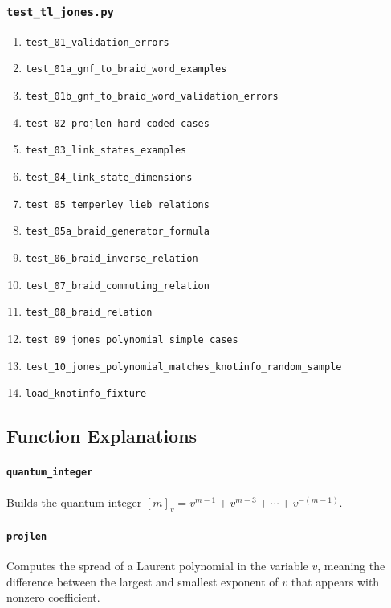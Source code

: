﻿\documentclass[10pt]{article}
\begin{document}
\subsubsection*{\texttt{test\_tl\_jones.py}}
\begin{enumerate}
  \item \texttt{test\_01\_validation\_errors}
  \item \texttt{test\_01a\_gnf\_to\_braid\_word\_examples}
  \item \texttt{test\_01b\_gnf\_to\_braid\_word\_validation\_errors}
  \item \texttt{test\_02\_projlen\_hard\_coded\_cases}
  \item \texttt{test\_03\_link\_states\_examples}
  \item \texttt{test\_04\_link\_state\_dimensions}
  \item \texttt{test\_05\_temperley\_lieb\_relations}
  \item \texttt{test\_05a\_braid\_generator\_formula}
  \item \texttt{test\_06\_braid\_inverse\_relation}
  \item \texttt{test\_07\_braid\_commuting\_relation}
  \item \texttt{test\_08\_braid\_relation}
  \item \texttt{test\_09\_jones\_polynomial\_simple\_cases}
  \item \texttt{test\_10\_jones\_polynomial\_matches\_knotinfo\_random\_sample}
  \item \texttt{load\_knotinfo\_fixture}
\end{enumerate}








\newpage
\subsection*{Function Explanations}

\paragraph{\texttt{quantum\_integer}}
Builds the quantum integer $[m]_v = v^{m-1} + v^{m-3} + \cdots + v^{-(m-1)}$. 

\paragraph{\texttt{projlen}}
Computes the spread of a Laurent polynomial in the variable \(v\), meaning the difference between the largest and smallest exponent of \(v\) that appears with nonzero coefficient.
\end{document}
